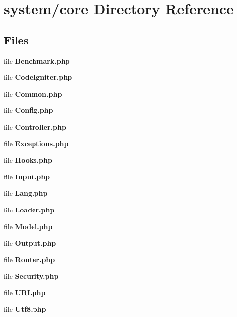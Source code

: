 \section{system/core Directory Reference}
\label{dir_a8ba19d3157762677be6d17aca8b7ef5}
\subsection*{Files}
\begin{DoxyCompactItemize}
\item 
file {\bf Benchmark.\-php}
\item 
file {\bf Code\-Igniter.\-php}
\item 
file {\bf Common.\-php}
\item 
file {\bf Config.\-php}
\item 
file {\bf Controller.\-php}
\item 
file {\bf Exceptions.\-php}
\item 
file {\bf Hooks.\-php}
\item 
file {\bf Input.\-php}
\item 
file {\bf Lang.\-php}
\item 
file {\bf Loader.\-php}
\item 
file {\bf Model.\-php}
\item 
file {\bf Output.\-php}
\item 
file {\bf Router.\-php}
\item 
file {\bf Security.\-php}
\item 
file {\bf U\-R\-I.\-php}
\item 
file {\bf Utf8.\-php}
\end{DoxyCompactItemize}
